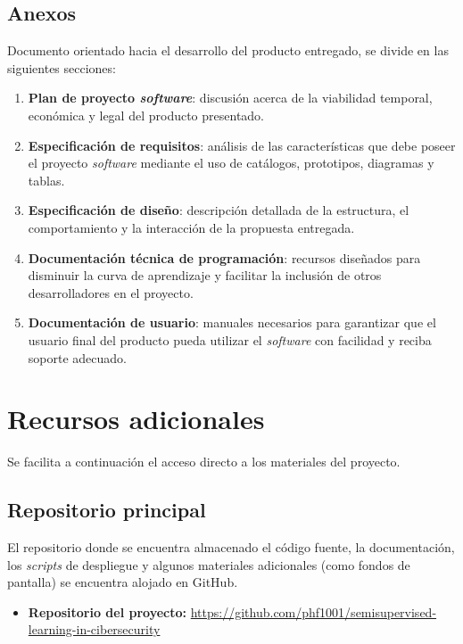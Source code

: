 \subsection{Anexos}

Documento orientado hacia el desarrollo del producto entregado, se divide en las siguientes secciones:

\begin{enumerate}
	\item \textbf{Plan de proyecto \textit{software}}: discusión acerca de la viabilidad temporal, económica y legal del producto presentado.
	\item \textbf{Especificación de requisitos}: análisis de las características que debe poseer el proyecto \textit{software} mediante el uso de catálogos, prototipos, diagramas y tablas.
	\item \textbf{Especificación de diseño}: descripción detallada de la estructura,
	el comportamiento y la interacción de la propuesta entregada.
	\item \textbf{Documentación técnica de programación}: recursos diseñados para disminuir la curva de aprendizaje y facilitar la inclusión de otros desarrolladores en el proyecto.
	\item \textbf{Documentación de usuario}: manuales necesarios para garantizar que el usuario final del producto pueda utilizar el \textit{software} con facilidad y reciba soporte adecuado.
\end{enumerate} 

\section{Recursos adicionales}

Se facilita a continuación el acceso directo a los materiales del proyecto.

\subsection{Repositorio principal}

El repositorio donde se encuentra almacenado el código fuente, la documentación, los \textit{scripts} de despliegue y algunos materiales adicionales (como fondos de pantalla) se encuentra alojado en GitHub.

\begin{itemize}
	\item \textbf{Repositorio del proyecto:}
	\url{https://github.com/phf1001/semisupervised-learning-in-cibersecurity}
\end{itemize}


